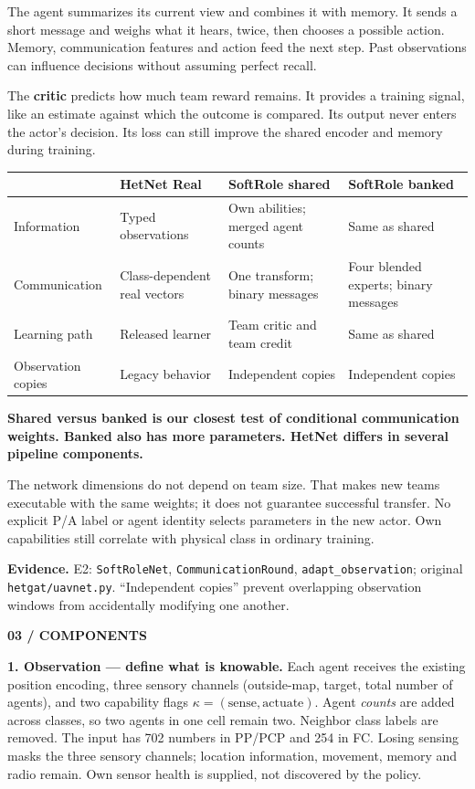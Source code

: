 \documentclass[11pt,letterpaper]{article}
\newcommand{\eyebrow}[1]{{\small\bfseries\color{teal}#1}\par\vspace{3pt}}
\newcommand{\pagetitle}[2]{\eyebrow{#1}{\fontsize{25}{28}\selectfont\bfseries #2\par}\vspace{7pt}}
\newcommand{\sub}[1]{\par\vspace{5pt}{\large\bfseries #1}\par\vspace{1pt}}
\newcommand{\takeaway}[1]{\par\vspace{5pt}\noindent\colorbox{pale}{\parbox{\dimexpr\linewidth-18pt\relax}{\vspace{5pt}\textbf{#1}\vspace{5pt}}}\par\vspace{3pt}}
\newcommand{\evidence}[1]{\vfill{\fontsize{8.4}{10.5}\selectfont\color{muted}\textbf{Evidence.} #1\par}}
\newcommand{\code}[1]{\nolinkurl{#1}}
\begin{document}
\sub{Read the diagram as a repeated cycle}
The agent summarizes its current view and combines it with memory. It sends a short message and weighs what it hears, twice, then chooses a possible action. Memory, communication features and action feed the next step. Past observations can influence decisions without assuming perfect recall.

The \textbf{critic} predicts how much team reward remains. It provides a training signal, like an estimate against which the outcome is compared. Its output never enters the actor's decision. Its loss can still improve the shared encoder and memory during training.

\sub{Three models, two different comparisons}
{\small\renewcommand{\arraystretch}{1.2}\begin{tabularx}{\linewidth}{@{}p{1.28in}XXX@{}}\toprule
 & HetNet Real & SoftRole shared & SoftRole banked \\\midrule
Information & Typed observations & Own abilities; merged agent counts & Same as shared \\
Communication & Class-dependent real vectors & One transform; binary messages & Four blended experts; binary messages \\
Learning path & Released learner & Team critic and team credit & Same as shared \\
Observation copies & Legacy behavior & Independent copies & Independent copies \\\bottomrule
\end{tabularx}}

\takeaway{Shared versus banked is our closest test of conditional communication weights. Banked also has more parameters. HetNet differs in several pipeline components.}
The network dimensions do not depend on team size. That makes new teams executable with the same weights; it does not guarantee successful transfer. No explicit P/A label or agent identity selects parameters in the new actor. Own capabilities still correlate with physical class in ordinary training.
\evidence{E2: \code{SoftRoleNet}, \code{CommunicationRound}, \code{adapt_observation}; original \code{hetgat/uavnet.py}. ``Independent copies'' prevent overlapping observation windows from accidentally modifying one another.}

\newpage
\pagetitle{03 / COMPONENTS}{What each part actually does}
\begingroup\normalsize
\textbf{1. Observation --- define what is knowable.} Each agent receives the existing position encoding, three sensory channels (outside-map, target, total number of agents), and two capability flags $\kappa=(\text{sense},\text{actuate})$. Agent \emph{counts} are added across classes, so two agents in one cell remain two. Neighbor class labels are removed. The input has 702 numbers in PP/PCP and 254 in FC. Losing sensing masks the three sensory channels; location information, movement, memory and radio remain. Own sensor health is supplied, not discovered by the policy.
\end{document}
